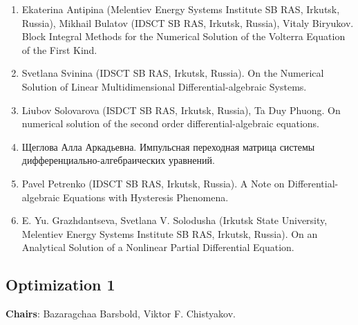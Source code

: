 \documentclass[
]{article}
\providecommand{\tightlist}{%
  \setlength{\itemsep}{0pt}\setlength{\parskip}{0pt}}
\begin{document}
\begin{enumerate}
\def\labelenumi{\arabic{enumi}.}
\tightlist
\item
  Ekaterina Antipina (Melentiev Energy Systems Institute SB RAS,
  Irkutsk, Russia), Mikhail Bulatov (IDSCT SB RAS, Irkutsk, Russia),
  Vitaly Biryukov. Block Integral Methods for the Numerical Solution of
  the Volterra Equation of the First Kind.
\item
  Svetlana Svinina (IDSCT SB RAS, Irkutsk, Russia). On the Numerical
  Solution of Linear Multidimensional Differential-algebraic Systems.
\item
  Liubov Solovarova (ISDCT SB RAS, Irkutsk, Russia), Ta Duy Phuong. On
  numerical solution of the second order differential-algebraic
  equations.
\item
  Щеглова Алла Аркадьевна. Импульсная переходная матрица системы
  дифференциально-алгебраических уравнений.
\item
  Pavel Petrenko (IDSCT SB RAS, Irkutsk, Russia). A Note on
  Differential-algebraic Equations with Hysteresis Phenomena.
\item
  E. Yu. Grazhdantseva, Svetlana V. Solodusha (Irkutsk State University,
  Melentiev Energy Systems Institute SB RAS, Irkutsk, Russia). On an
  Analytical Solution of a Nonlinear Partial Differential Equation.
\end{enumerate}

\hypertarget{o1}{%
\subsection{Optimization 1}\label{o1}}

\textbf{Chairs}: Bazaragchaa Barsbold, Viktor F. Chistyakov.
\end{document}
